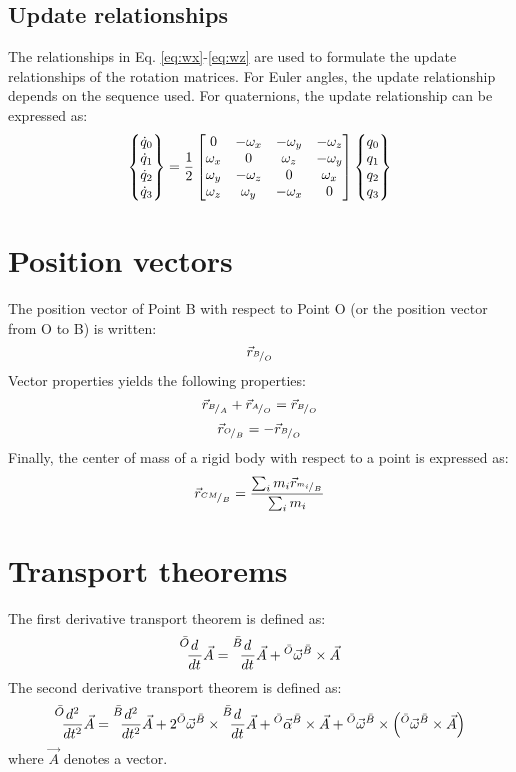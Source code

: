 \documentclass{article}
\begin{document}
\subsection{Update relationships}
\label{subsec:updates}
The relationships in Eq. \ref{eq:wx}-\ref{eq:wz} are used to formulate the update relationships of the rotation matrices. For Euler angles, the update relationship depends on the sequence used. For quaternions, the update relationship can be expressed as:
\begin{equation}
      \begin{Bmatrix} {\dot{q}_0} \\ {\dot{q}_1} \\ {\dot{q}_2} \\ {\dot{q}_3} \end{Bmatrix}  = \frac{1}{2} \begin{bmatrix} 0 & -\omega_x & -\omega_y & -\omega_z \\ \omega_x & 0 & \omega_z & -\omega_y \\ \omega_y & -\omega_z & 0 & \omega_x \\ \omega_z & \omega_y & -\omega_x & 0 \end{bmatrix}  \begin{Bmatrix} {q_0} \\ {q_1} \\ {q_2} \\ {q_3} \end{Bmatrix}  
    \label{eq:qd}
\end{equation}



\section{Position vectors}
\label{sec:posn}
The position vector of Point B with respect to Point O (or the position vector from O to B) is written:
\begin{equation}
    \vec{r}_{{}^{B}\!/_{O}}
\end{equation}
%
Vector properties yields the following properties:
\begin{equation}
    \vec{r}_{{}^{B}\!/_{A}} + \vec{r}_{{}^{A}\!/_{O}} = \vec{r}_{{}^{B}\!/_{O}}
    \label{eq:rbo}
\end{equation}
\begin{equation}
    \vec{r}_{{}^{O}\!/_{B}} = -\vec{r}_{{}^{B}\!/_{O}}
\end{equation}
% 
Finally, the center of mass of a rigid body with respect to a point is expressed as:
\begin{equation}
    \vec{r}_{{}^{CM}\!/_{B}} = \frac{\sum_{i} m_i\vec{r}_{{}^{m_i}\!/_{B}}}{\sum_{i} m_i} 
    \label{eq:rcm}
\end{equation}



\section{Transport theorems}
\label{sec:trans}
The first derivative transport theorem is defined as:
\begin{equation}
    \TransOne{O}{B}{\vec{A}}
    \label{eq:transone}
\end{equation}
The second derivative transport theorem is defined as:
\begin{equation}
    \TransTwo{O}{B}{\vec{A}}
    \label{eq:transtwo}
\end{equation}
where $\vec{A}$ denotes a vector. 
\end{document}
